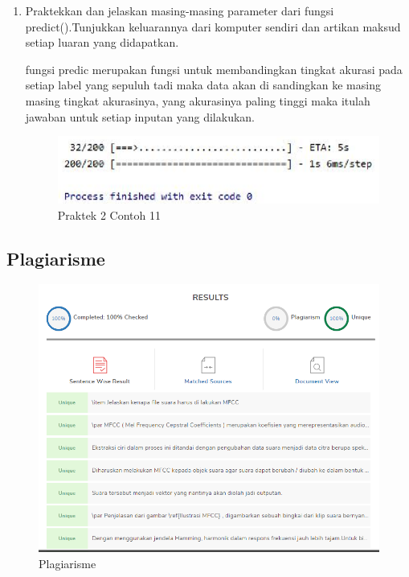 \begin{enumerate}
		\item Praktekkan dan jelaskan masing-masing parameter dari fungsi predict().Tunjukkan keluarannya dari komputer sendiri dan artikan maksud setiap luaran yang didapatkan.
		\par fungsi predic merupakan fungsi untuk membandingkan tingkat akurasi pada setiap label yang sepuluh tadi maka data akan di sandingkan ke masing masing tingkat akurasinya, yang akurasinya paling tinggi maka itulah jawaban untuk setiap inputan yang dilakukan.

    	   	\begin{figure}[H]
				\centering
				\includegraphics[scale=0.4]{figures/1174057/chapter6/p11.PNG}
				\caption{Praktek 2 Contoh 11}
				\label{Praktek 2 Contoh 11}
			\end{figure}
	\end{enumerate}

    \subsection{Plagiarisme}
    	   	\begin{figure}[H]
				\centering
				\includegraphics[scale=0.5]{figures/1174057/chapter6/plagiat.PNG}
				\caption{Plagiarisme}
				\label{Plagiarisme}
			\end{figure}